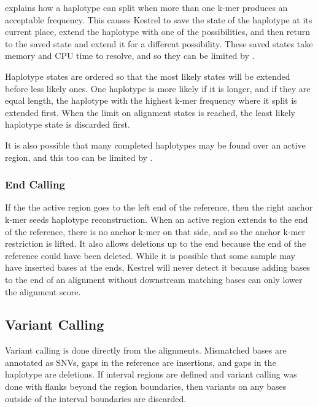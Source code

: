  explains how a haplotype can split when more than one k-mer produces an acceptable frequency. This causes Kestrel to save the state of the haplotype at its current place, extend the haplotype with one of the possibilities, and then return to the saved state and extend it for a different possibility. These saved states take memory and CPU time to resolve, and so they can be limited by .

Haplotype states are ordered so that the most likely states will be extended before less likely ones. One haplotype is more likely if it is longer, and if they are equal length, the haplotype with the highest k-mer frequency where it split is extended first. When the limit on alignment states is reached, the least likely haplotype state is discarded first.

It is also possible that many completed haplotypes may be found over an active region, and this too can be limited by .


\subsubsection{End Calling}
\label{sec.process.haplo.ends}

If the the active region goes to the left end of the reference, then the right anchor k-mer seeds haplotype reconstruction. When an active region extends to the end of the reference, there is no anchor k-mer on that side, and so the anchor k-mer restriction is lifted. It also allows deletions up to the end because the end of the reference could have been deleted. While it is possible that some sample may have inserted bases at the ends, Kestrel will never detect it because adding bases to the end of an alignment without downstream matching bases can only lower the alignment score.


\subsection{Variant Calling}
\label{sec.process.varcall}

Variant calling is done directly from the alignments. Mismatched bases are annotated as SNVs, gaps in the reference are insertions, and gaps in the haplotype are deletions. If interval regions are defined and variant calling was done with flanks beyond the region boundaries, then variants on any bases outside of the interval boundaries are discarded.

